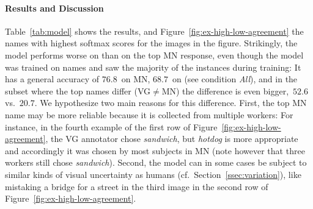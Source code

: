 \paragraph{Results and Discussion}
Table~\ref{tab:model} shows the results, and Figure~\ref{fig:ex-high-low-agreement} the names with highest softmax scores for the images in the figure.
Strikingly, the model performs worse on \vg than on the top MN response, even though the model was trained on \vg names and saw the majority of the instances during training: It has a general accuracy of $76.8$\ on MN, $68.7$\ on \vg (see condition \textit{All}), and in the subset where the top names differ (VG$\neq$MN) the difference is even bigger,\ $52.6$ vs.\ $20.7$.
We hypothesize two main reasons for this difference.
First, the top MN name may be more reliable because it is collected from multiple workers: For instance, in the fourth example of the first row of Figure~\ref{fig:ex-high-low-agreement}, the VG annotator chose \textsl{sandwich}, but \textsl{hotdog} is more appropriate and accordingly it was chosen by most subjects in MN (note however that three workers still chose \textsl{sandwich}).
Second, the model can in some cases be subject to similar kinds of visual uncertainty as humans (cf.\ Section\ \ref{ssec:variation}), like mistaking a bridge for a street in the third image in the second row of Figure~\ref{fig:ex-high-low-agreement}.

